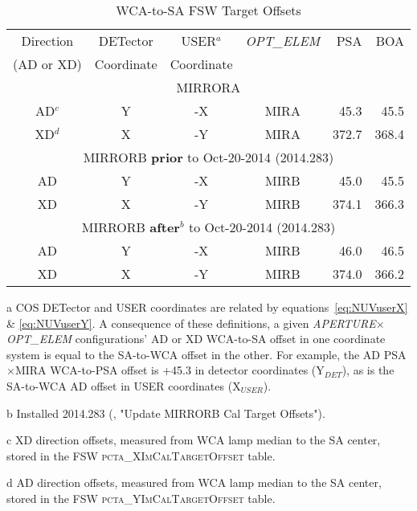 \begin{center}
\begin{table}
\footnotesize
	\centering
	\begin{threeparttable}
	\caption[\textsc{pcta\_[X,Y]ImCalTargetOffset} Values]{ WCA-to-SA FSW Target Offsets}
		\begin{tabular*}{.895\linewidth}{@{\extracolsep{\fill}}ccccrr}
		\toprule
		Direction & DETector & USER$^{a}$ & \textit{OPT\_ELEM}  &	PSA	&	BOA\\
		(AD or XD) & Coordinate &	Coordinate &	&	\\
		\bottomrule
		\midrule
		\multicolumn{6}{c}{MIRRORA}\\
		\midrule
		AD$^c$	&	Y	&	-X	&	MIRA	&	45.3	&	45.5 \\
		XD$^d$	&	X	&	-Y	&	MIRA	&	372.7	&	368.4 \\
		\midrule
		\multicolumn{6}{c}{MIRRORB {\bf prior} to Oct-20-2014 (2014.283)}\\
		\midrule
		AD	&	Y	&	-X	&	MIRB	&	45.0	&	45.5 \\
		XD	&	X	&	-Y	&	MIRB	&	374.1	&	366.3 \\
		\midrule
		\multicolumn{6}{c}{MIRRORB {\bf after}$^{b}$ to Oct-20-2014 (2014.283)}\\
		\midrule
		AD	&	Y	&	-X	&	MIRB	&	46.0	&	46.5 \\
		XD	&	X	&	-Y	&	MIRB	&	374.0	&	366.2 \\
		\bottomrule
		\end{tabular*}
		\label{tab:pctaWCA2SANIM}
		\footnotesize
		\begin{tablenotes}
			\item[a] COS DETector and USER coordinates are related by equations~\ref{eq:NUVuserX} \& \ref{eq:NUVuserY}. A consequence of
			these definitions, a given \textit{APERTURE}$\times$\textit{OPT\_ELEM} configurations' AD or XD WCA-to-SA offset in one coordinate system is equal to the SA-to-WCA offset in the other.
			For example, the AD PSA$\times$MIRA WCA-to-PSA offset is +45.3 in detector coordinates (Y$_{DET}$), as is the SA-to-WCA AD offset in USER coordinates (X$_{USER}$).
			\item[b] Installed 2014.283 (, "Update MIRRORB Cal Target Offsets").
			\item[c] XD direction offsets, measured from WCA lamp median to the SA center, stored in the FSW \textsc{pcta\_XImCalTargetOffset} table.
			\item[d] AD direction offsets, measured from WCA lamp median to the SA center, stored in the FSW \textsc{pcta\_YImCalTargetOffset} table.
		\end{tablenotes}
		\normalsize
	\end{threeparttable}
\normalsize
\end{table}
\end{center}
